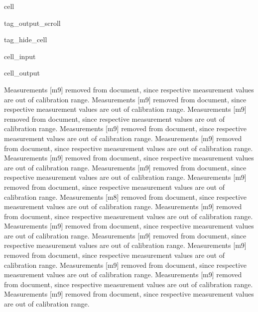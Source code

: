 \documentclass[letterpaper,12pt,english]{jupyterBook}
\begin{document}
\begin{sphinxuseclass}{cell}
\begin{sphinxuseclass}{tag_output_scroll}
\begin{sphinxuseclass}{tag_hide_cell}
\begin{sphinxVerbatimInput}
\begin{sphinxuseclass}{cell_input}
\end{sphinxuseclass}\end{sphinxVerbatimInput}
\begin{sphinxVerbatimOutput}

\begin{sphinxuseclass}{cell_output}
\begin{sphinxVerbatim}[commandchars=\\\{\}]
Measurements \PYGZsq{}[\PYGZsq{}m9\PYGZsq{}]\PYGZsq{} removed from document, since respective measurement values are out of calibration range.
Measurements \PYGZsq{}[\PYGZsq{}m9\PYGZsq{}]\PYGZsq{} removed from document, since respective measurement values are out of calibration range.
Measurements \PYGZsq{}[\PYGZsq{}m9\PYGZsq{}]\PYGZsq{} removed from document, since respective measurement values are out of calibration range.
Measurements \PYGZsq{}[\PYGZsq{}m9\PYGZsq{}]\PYGZsq{} removed from document, since respective measurement values are out of calibration range.
Measurements \PYGZsq{}[\PYGZsq{}m9\PYGZsq{}]\PYGZsq{} removed from document, since respective measurement values are out of calibration range.
Measurements \PYGZsq{}[\PYGZsq{}m9\PYGZsq{}]\PYGZsq{} removed from document, since respective measurement values are out of calibration range.
Measurements \PYGZsq{}[\PYGZsq{}m9\PYGZsq{}]\PYGZsq{} removed from document, since respective measurement values are out of calibration range.
Measurements \PYGZsq{}[\PYGZsq{}m9\PYGZsq{}]\PYGZsq{} removed from document, since respective measurement values are out of calibration range.
Measurements \PYGZsq{}[\PYGZsq{}m8\PYGZsq{}]\PYGZsq{} removed from document, since respective measurement values are out of calibration range.
Measurements \PYGZsq{}[\PYGZsq{}m9\PYGZsq{}]\PYGZsq{} removed from document, since respective measurement values are out of calibration range.
Measurements \PYGZsq{}[\PYGZsq{}m9\PYGZsq{}]\PYGZsq{} removed from document, since respective measurement values are out of calibration range.
Measurements \PYGZsq{}[\PYGZsq{}m9\PYGZsq{}]\PYGZsq{} removed from document, since respective measurement values are out of calibration range.
Measurements \PYGZsq{}[\PYGZsq{}m9\PYGZsq{}]\PYGZsq{} removed from document, since respective measurement values are out of calibration range.
Measurements \PYGZsq{}[\PYGZsq{}m9\PYGZsq{}]\PYGZsq{} removed from document, since respective measurement values are out of calibration range.
Measurements \PYGZsq{}[\PYGZsq{}m9\PYGZsq{}]\PYGZsq{} removed from document, since respective measurement values are out of calibration range.
Measurements \PYGZsq{}[\PYGZsq{}m9\PYGZsq{}]\PYGZsq{} removed from document, since respective measurement values are out of calibration range.

\end{sphinxVerbatim}
\end{sphinxuseclass}
\end{sphinxVerbatimOutput}
\end{sphinxuseclass}
\end{sphinxuseclass}
\end{sphinxuseclass}
\end{document}
